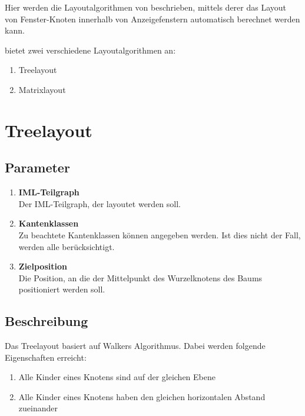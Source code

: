 %
%
%

Hier werden die Layoutalgorithmen von \product beschrieben, mittels
derer das Layout von Fenster-Knoten innerhalb von Anzeigefenstern
automatisch berechnet werden kann.

\product bietet zwei verschiedene Layoutalgorithmen an:
\begin{enumerate}
  \item Treelayout
  \item Matrixlayout
\end{enumerate}

\section{Treelayout}
\subsection{Parameter}
\begin{enumerate}
  \item \textbf{IML-Teilgraph}\\
Der IML-Teilgraph, der layoutet werden soll.
  \item \textbf{Kantenklassen}\\
Zu beachtete Kantenklassen k\"onnen angegeben werden. Ist dies nicht der Fall, werden alle ber\"ucksichtigt.
  \item \textbf{Zielposition}\\
Die Position, an die der Mittelpunkt des Wurzelknotens des Baums positioniert werden soll.
\end{enumerate}

\subsection{Beschreibung}
Das Treelayout basiert auf Walkers Algorithmus. Dabei werden folgende Eigenschaften erreicht:
\begin{enumerate}
   \item Alle Kinder eines Knotens sind auf der gleichen Ebene
   \item Alle Kinder eines Knotens haben den gleichen horizontalen Abstand zueinander
\end{enumerate}


